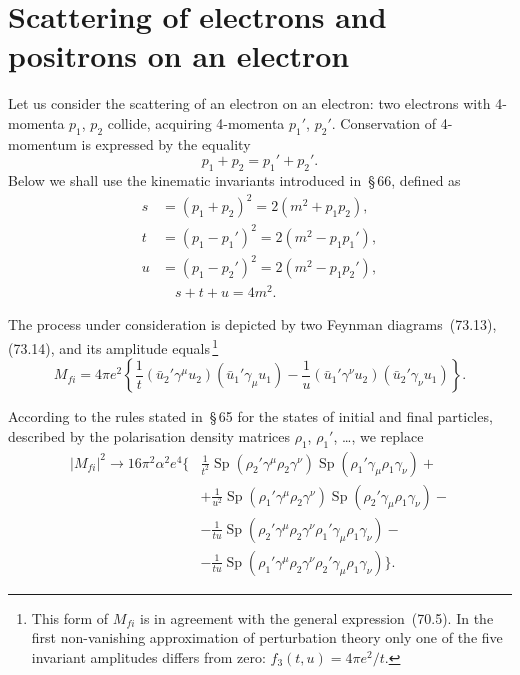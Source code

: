 \section{Scattering of electrons and positrons on an electron}

Let us consider the scattering of an electron on an electron: two electrons with 4-momenta $p_1$, $p_2$ collide, acquiring 4-momenta $p_1'$, $p_2'$. Conservation of 4-momentum is expressed by the equality
\begin{equation}
p_1 + p_2 = p_1' + p_2'.
\tag{81.1}
\end{equation}
Below we shall use the kinematic invariants introduced in~\S\,66, defined as
\begin{equation}
\begin{split}
s &= (p_1 + p_2)^2 = 2(m^2 + p_1 p_2),\\
t &= (p_1 - p_1')^2 = 2(m^2 - p_1 p_1'),\\
u &= (p_1 - p_2')^2 = 2(m^2 - p_1 p_2'),\\
&\quad s + t + u = 4m^2.
\end{split}
\tag{81.2}
\end{equation}

The process under consideration is depicted by two Feynman diagrams~(73.13), (73.14), and its amplitude equals\,\footnote{This form of $M_{fi}$ is in agreement with the general expression~(70.5). In the first non-vanishing approximation of perturbation theory only one of the five invariant amplitudes differs from zero: $f_3(t,u) = 4\pi e^2/t$.}
\begin{equation}
M_{fi} = 4\pi e^2\left\{\frac{1}{t}(\bar{u}_2'\gamma^\mu u_2)(\bar{u}_1'\gamma_\mu u_1) - \frac{1}{u}(\bar{u}_1'\gamma^\nu u_2)(\bar{u}_2'\gamma_\nu u_1)\right\}.
\tag{81.3}
\end{equation}

According to the rules stated in~\S\,65 for the states of initial and final particles, described by the polarisation density matrices $\rho_1$, $\rho_1'$, \ldots, we replace
\begin{equation}
\begin{split}
|M_{fi}|^2 \to 16\pi^2 \alpha^2 e^4\bigg\{&\frac{1}{t^2}\operatorname{Sp}(\rho_2'\gamma^\mu\rho_2\gamma^\nu)\operatorname{Sp}(\rho_1'\gamma_\mu\rho_1\gamma_\nu) +{}\\
&+ \frac{1}{u^2}\operatorname{Sp}(\rho_1'\gamma^\mu\rho_2\gamma^\nu)\operatorname{Sp}(\rho_2'\gamma_\mu\rho_1\gamma_\nu) -{}\\
&- \frac{1}{tu}\operatorname{Sp}(\rho_2'\gamma^\mu\rho_2\gamma^\nu\rho_1'\gamma_\mu\rho_1\gamma_\nu) -{}\\
&- \frac{1}{tu}\operatorname{Sp}(\rho_1'\gamma^\mu\rho_2\gamma^\nu\rho_2'\gamma_\mu\rho_1\gamma_\nu)\bigg\}.
\end{split}
\tag{81.4}
\end{equation}

